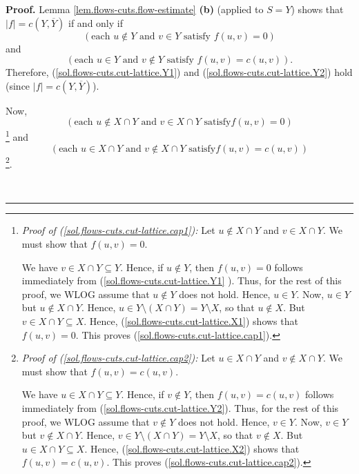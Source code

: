 \documentclass[numbers=enddot,12pt,final,onecolumn,notitlepage]{scrartcl}%
\theoremstyle{definition}
\newenvironment{proof}[1][Proof]{\noindent\textbf{#1.} }{\ \rule{0.5em}{0.5em}}
\begin{document}
\begin{proof}
Lemma \ref{lem.flows-cuts.flow-estimate} \textbf{(b)} (applied to $S=Y$) shows
that $\left\vert f\right\vert =c\left(  Y,\overline{Y}\right)  $ if and only
if
\begin{equation}
\left(  \text{each }u\notin Y\text{ and }v\in Y\text{ satisfy }f\left(
u,v\right)  =0\right)  \label{sol.flows-cuts.cut-lattice.Y1}%
\end{equation}
and%
\begin{equation}
\left(  \text{each }u\in Y\text{ and }v\notin Y\text{ satisfy }f\left(
u,v\right)  =c\left(  u,v\right)  \right)  .
\label{sol.flows-cuts.cut-lattice.Y2}%
\end{equation}
Therefore, (\ref{sol.flows-cuts.cut-lattice.Y1}) and
(\ref{sol.flows-cuts.cut-lattice.Y2}) hold (since $\left\vert f\right\vert
=c\left(  Y,\overline{Y}\right)  $).

Now,
\begin{equation}
\left(  \text{each }u\notin X\cap Y\text{ and }v\in X\cap Y\text{ satisfy
}f\left(  u,v\right)  =0\right)  \label{sol.flows-cuts.cut-lattice.cap1}%
\end{equation}
\footnote{\textit{Proof of (\ref{sol.flows-cuts.cut-lattice.cap1}):} Let
$u\notin X\cap Y$ and $v\in X\cap Y$. We must show that $f\left(  u,v\right)
=0$.
\par
We have $v\in X\cap Y\subseteq Y$. Hence, if $u\notin Y$, then $f\left(
u,v\right)  =0$ follows immediately from (\ref{sol.flows-cuts.cut-lattice.Y1}%
). Thus, for the rest of this proof, we WLOG assume that $u\notin Y$ does not
hold. Hence, $u\in Y$. Now, $u\in Y$ but $u\notin X\cap Y$. Hence, $u\in
Y\setminus\left(  X\cap Y\right)  =Y\setminus X$, so that $u\notin X$. But
$v\in X\cap Y\subseteq X$. Hence, (\ref{sol.flows-cuts.cut-lattice.X1}) shows
that $f\left(  u,v\right)  =0$. This proves
(\ref{sol.flows-cuts.cut-lattice.cap1}).} and%
\begin{equation}
\left(  \text{each }u\in X\cap Y\text{ and }v\notin X\cap Y\text{ satisfy
}f\left(  u,v\right)  =c\left(  u,v\right)  \right)
\label{sol.flows-cuts.cut-lattice.cap2}%
\end{equation}
\footnote{\textit{Proof of (\ref{sol.flows-cuts.cut-lattice.cap2}):} Let $u\in
X\cap Y$ and $v\notin X\cap Y$. We must show that $f\left(  u,v\right)
=c\left(  u,v\right)  $.
\par
We have $u\in X\cap Y\subseteq Y$. Hence, if $v\notin Y$, then $f\left(
u,v\right)  =c\left(  u,v\right)  $ follows immediately from
(\ref{sol.flows-cuts.cut-lattice.Y2}). Thus, for the rest of this proof, we
WLOG assume that $v\notin Y$ does not hold. Hence, $v\in Y$. Now, $v\in Y$ but
$v\notin X\cap Y$. Hence, $v\in Y\setminus\left(  X\cap Y\right)  =Y\setminus
X$, so that $v\notin X$. But $u\in X\cap Y\subseteq X$. Hence,
(\ref{sol.flows-cuts.cut-lattice.X2}) shows that $f\left(  u,v\right)
=c\left(  u,v\right)  $. This proves (\ref{sol.flows-cuts.cut-lattice.cap2}).}.


\end{proof}
\end{document}
